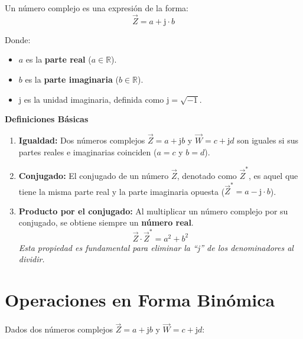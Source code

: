 \documentclass[
  a4paper,
  DIV=11,
  numbers=noendperiod]{scrreprt}
\providecommand{\tightlist}{%
  \setlength{\itemsep}{0pt}\setlength{\parskip}{0pt}}
\begin{document}
Un número complejo es una expresión de la forma:
\[\vec{Z} = a + \mathrm{j} \cdot b\]

Donde:

\begin{itemize}
\tightlist
\item
  \(a\) es la \textbf{parte real} (\(a \in \mathbb{R}\)).
\item
  \(b\) es la \textbf{parte imaginaria} (\(b \in \mathbb{R}\)).
\item
  \(\mathrm{j}\) es la unidad imaginaria, definida como
  \(\mathrm{j} = \sqrt{-1}\).
\end{itemize}

\begin{tcolorbox}[enhanced jigsaw, breakable, colback=white, left=2mm, leftrule=.75mm, rightrule=.15mm, toprule=.15mm, colframe=quarto-callout-note-color-frame, arc=.35mm, bottomrule=.15mm, opacityback=0]

\vspace{-3mm}\textbf{Definiciones Básicas}\vspace{3mm}

\begin{enumerate}
\def\labelenumi{\arabic{enumi}.}
\tightlist
\item
  \textbf{Igualdad:} Dos números complejos \(\vec{Z} = a + \mathrm{j}b\)
  y \(\vec{W} = c + \mathrm{j}d\) son iguales si sus partes reales e
  imaginarias coinciden (\(a=c\) y \(b=d\)).
\item
  \textbf{Conjugado:} El conjugado de un número \(\vec{Z}\), denotado
  como \(\vec{Z}^*\), es aquel que tiene la misma parte real y la parte
  imaginaria opuesta (\(\vec{Z}^* = a - \mathrm{j} \cdot b\)).
\item
  \textbf{Producto por el conjugado:} Al multiplicar un número complejo
  por su conjugado, se obtiene siempre un \textbf{número real}.
  \[\vec{Z} \cdot \vec{Z}^* = a^2 + b^2\] \emph{Esta propiedad es
  fundamental para eliminar la ``j'' de los denominadores al dividir.}
\end{enumerate}

\end{tcolorbox}

\section{Operaciones en Forma
Binómica}\label{operaciones-en-forma-binuxf3mica}

Dados dos números complejos \(\vec{Z} = a + \mathrm{j}b\) y
\(\vec{W} = c + \mathrm{j}d\):
\end{document}

